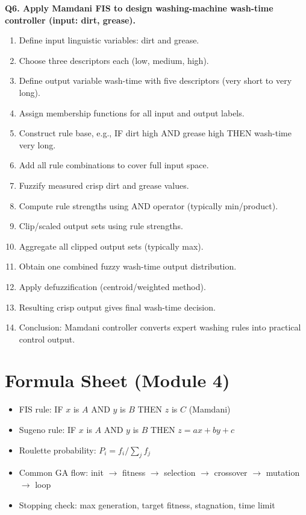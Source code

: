 \documentclass[11pt,a4paper]{article}
\begin{document}
\textbf{Q6. Apply Mamdani FIS to design washing-machine wash-time controller (input: dirt, grease).}
\begin{enumerate}
\item Define input linguistic variables: dirt and grease.
\item Choose three descriptors each (low, medium, high).
\item Define output variable wash-time with five descriptors (very short to very long).
\item Assign membership functions for all input and output labels.
\item Construct rule base, e.g., IF dirt high AND grease high THEN wash-time very long.
\item Add all rule combinations to cover full input space.
\item Fuzzify measured crisp dirt and grease values.
\item Compute rule strengths using AND operator (typically min/product).
\item Clip/scaled output sets using rule strengths.
\item Aggregate all clipped output sets (typically max).
\item Obtain one combined fuzzy wash-time output distribution.
\item Apply defuzzification (centroid/weighted method).
\item Resulting crisp output gives final wash-time decision.
\item Conclusion: Mamdani controller converts expert washing rules into practical control output.
\end{enumerate}

\section*{Formula Sheet (Module 4)}
\begin{itemize}
\item FIS rule: IF $x$ is $A$ AND $y$ is $B$ THEN $z$ is $C$ (Mamdani)
\item Sugeno rule: IF $x$ is $A$ AND $y$ is $B$ THEN $z=ax+by+c$
\item Roulette probability: $P_i=f_i/\sum_j f_j$
\item Common GA flow: init $\to$ fitness $\to$ selection $\to$ crossover $\to$ mutation $\to$ loop
\item Stopping check: max generation, target fitness, stagnation, time limit
\end{itemize}
\end{document}
